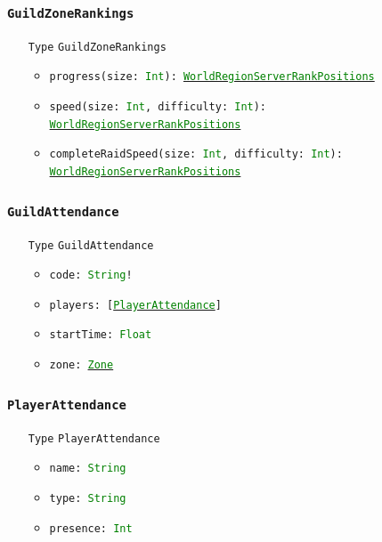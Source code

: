 \documentclass[10pt, a4paper]{memoir}
\numberwithin{equation}{section}
\theoremstyle{plain}
\theoremstyle{defp}
\theoremstyle{dotless}
\theoremstyle{definition}
\theoremstyle{dotless}
\theoremstyle{dotless}
\theoremstyle{defp}
\theoremstyle{defp}
\theoremstyle{be}          %
\theoremstyle{defp}
\newcommand\ttt[1]{\texttt{#1}}
\newcommand\type[1]{\ttt{\textcolor{green}{#1}}}
\begin{document}
\subsubsection{\ttt{GuildZoneRankings}}\label{sec:GuildZoneRankings}

\begin{itemize}[noitemsep,topsep=1pt]
\item[\ttt{Type}] \ttt{GuildZoneRankings}
\begin{itemize}[itemsep=1pt,topsep=1pt]
\item \ttt{progress(size: \type{Int}): \hyperref[sec:WorldRegionServerRankPositions]{\type{WorldRegionServerRankPositions}}}
\item \ttt{speed(size: \type{Int}, difficulty: \type{Int}): \hyperref[sec:WorldRegionServerRankPositions]{\type{WorldRegionServerRankPositions}}}
\item \ttt{completeRaidSpeed(size: \type{Int}, difficulty: \type{Int}): \hyperref[sec:WorldRegionServerRankPositions]{\type{WorldRegionServerRankPositions}}}
\end{itemize}
\end{itemize}

\subsubsection{\ttt{GuildAttendance}}\label{sec:GuildAttendance}

\begin{itemize}[noitemsep,topsep=1pt]
\item[\ttt{Type}] \ttt{GuildAttendance}
\begin{itemize}[itemsep=1pt, topsep=1pt]
\item \ttt{code: \type{String}!}
\item \ttt{players: [\hyperref[sec:PlayerAttendance]{\type{PlayerAttendance}}]}
\item \ttt{startTime: \type{Float}}
\item \ttt{zone: \hyperref[sec:Zone]{\type{Zone}}}
\end{itemize}
\end{itemize}

\subsubsection{\ttt{PlayerAttendance}}\label{sec:PlayerAttendance}

\begin{itemize}[noitemsep,topsep=1pt]
\item[\ttt{Type}] \ttt{PlayerAttendance}
\begin{itemize}[itemsep=1pt,topsep=1pt]
\item \ttt{name: \type{String}}
\item \ttt{type: \type{String}}
\item \ttt{presence: \type{Int}}
\end{itemize}
\end{itemize}
\end{document}
